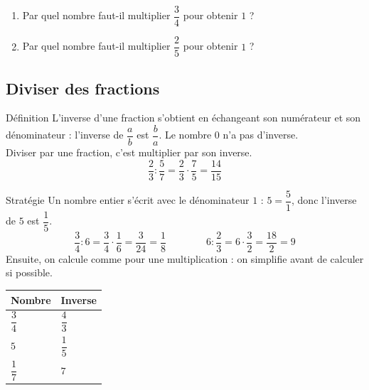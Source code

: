 \begin{enumerate}[leftmargin=*,align=parleft, label=\alph*), itemsep=9pt]
\item Par quel nombre faut-il multiplier $\dfrac{3}{4}$ pour obtenir $1$ ?
\item Par quel nombre faut-il multiplier $\dfrac{2}{5}$ pour obtenir $1$ ?
\end{enumerate}

\subsection{Diviser des fractions}
 
\begin{regle}{Définition}
L'\textcolor{themeColor}{inverse} d'une fraction s'obtient en échangeant son numérateur et son dénominateur : l'inverse de $\dfrac{a}{b}$ est $\dfrac{b}{a}$. Le nombre $0$ n'a pas d'inverse.\\[5pt]
\textcolor{themeColor}{Diviser} par une fraction, c'est multiplier par son inverse.
\[\dfrac{2}{3} : \dfrac{5}{7}=\dfrac{2}{3} \cdot \dfrac{7}{5}=\dfrac{14}{15}\]
\end{regle}
 
\vspace{20pt}
\begin{astuce}{Stratégie}
Un nombre entier s'écrit avec le dénominateur $1$ : $5=\dfrac{5}{1}$, donc l'inverse de $5$ est $\dfrac{1}{5}$.
\[\dfrac{3}{4} : 6=\dfrac{3}{4} \cdot \dfrac{1}{6}=\dfrac{3}{24}=\dfrac{1}{8} \qquad\qquad 6 : \dfrac{2}{3}=6 \cdot \dfrac{3}{2}=\dfrac{18}{2}=9\]
Ensuite, on calcule comme pour une multiplication : on simplifie avant de calculer si possible.
\end{astuce}
 
\vspace{20pt}
\def\arraystretch{3}
\begin{tabularx}{\linewidth}{|>{\centering\arraybackslash}X|>{\centering\arraybackslash}X|}
\hline
\cellcolor{themeNO!30}\textbf{Nombre} & \cellcolor{themeNO!30}\textbf{Inverse} \\\hline
$\dfrac{3}{4}$ & $\dfrac{4}{3}$ \\\hline
$5$ & $\dfrac{1}{5}$ \\\hline
$\dfrac{1}{7}$ & $7$ \\\hline
\end{tabularx}
\def\arraystretch{1}
 
 
\newpage
